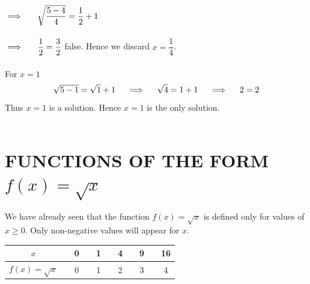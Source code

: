 \documentclass[11pt,a4paper]{article}
\begin{document}
$\implies \hspace{0.5cm} \sqrt{\dfrac{5-4}{4}}=\dfrac{1}{2}+1$\\\\
$\implies \hspace{0.5cm} \dfrac{1}{2}=\dfrac{3}{2}$ false. Hence we discard $x=\dfrac{1}{4}$.\\\\

For $x=1$ $$\sqrt{5-1}=\sqrt{1}+1\hspace{0.4cm} \implies \hspace{0.4cm} \sqrt{4}=1+1\hspace{0.4cm} \implies \hspace{0.4cm} 2=2$$
Thus $x=1$ is a solution. Hence $x=1$ is the only solution.\\\\








\pagebreak
\section{FUNCTIONS OF THE FORM $f(x)=\sqrt{x}$}
We have already seen that the function $f(x)=\sqrt{x}$ is defined only for values of $x\geq 0$. Only non-negative values will appear for $x$.\\

\begin{table}[H]
\centering
\begin{tabular}{c|cccccccccc}
$x$ && 0 && 1 && 4 && 9 && 16\\
\hline
$f(x)=\sqrt{x}$ && 0 && 1 && 2 && 3 && 4\\
\end{tabular}
\end{table}
\vspace{0.4cm}



\begin{figure}[H]
\centering
{}
\end{figure}
\vspace{1cm}
\end{document}
